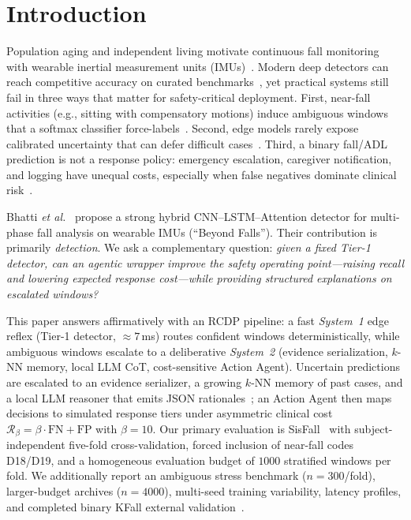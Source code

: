 \documentclass[journal]{IEEEtran}
\begin{document}
\section{Introduction}
\label{sec:intro}

Population aging and independent living motivate continuous fall monitoring with wearable inertial measurement units (IMUs)~\cite{iglesias2019wearable,nurek2020fallsurvey,khan2017review,sisfall2017}. Modern deep detectors can reach competitive accuracy on curated benchmarks~\cite{ren2021survey}, yet practical systems still fail in three ways that matter for safety-critical deployment. First, near-fall activities (e.g., sitting with compensatory motions) induce ambiguous windows that a softmax classifier force-labels~\cite{aziz2016fall}. Second, edge models rarely expose calibrated uncertainty that can defer difficult cases~\cite{guo2017calibration,geifman2017selective,el2010foundations}. Third, a binary fall/ADL prediction is not a response policy: emergency escalation, caregiver notification, and logging have unequal costs, especially when false negatives dominate clinical risk~\cite{elkan2001foundations}.

Bhatti \textit{et al.}~\cite{bhatti2025beyond} propose a strong hybrid CNN--LSTM--Attention detector for multi-phase fall analysis on wearable IMUs (``Beyond Falls''). Their contribution is primarily \emph{detection}. We ask a complementary question: \emph{given a fixed Tier-1 detector, can an agentic wrapper improve the safety operating point---raising recall and lowering expected response cost---while providing structured explanations on escalated windows?}

This paper answers affirmatively with an RCDP pipeline: a fast \emph{System~1} edge reflex (Tier-1 detector, $\approx 7$\,ms) routes confident windows deterministically, while ambiguous windows escalate to a deliberative \emph{System~2} (evidence serialization, $k$-NN memory, local LLM CoT, cost-sensitive Action Agent). Uncertain predictions are escalated to an evidence serializer, a growing $k$-NN memory of past cases, and a local LLM reasoner that emits JSON rationales~\cite{wei2022cot,lewis2020rag,yao2023react}; an Action Agent then maps decisions to simulated response tiers under asymmetric clinical cost $\mathcal{R}_\beta=\beta\cdot\mathrm{FN}+\mathrm{FP}$ with $\beta{=}10$. Our primary evaluation is SisFall~\cite{sisfall2017} with subject-independent five-fold cross-validation, forced inclusion of near-fall codes D18/D19, and a homogeneous evaluation budget of $1000$ stratified windows per fold. We additionally report an ambiguous stress benchmark ($n{=}300$/fold), larger-budget archives ($n{=}4000$), multi-seed training variability, latency profiles, and completed binary KFall external validation~\cite{kfall2021}.
\end{document}
